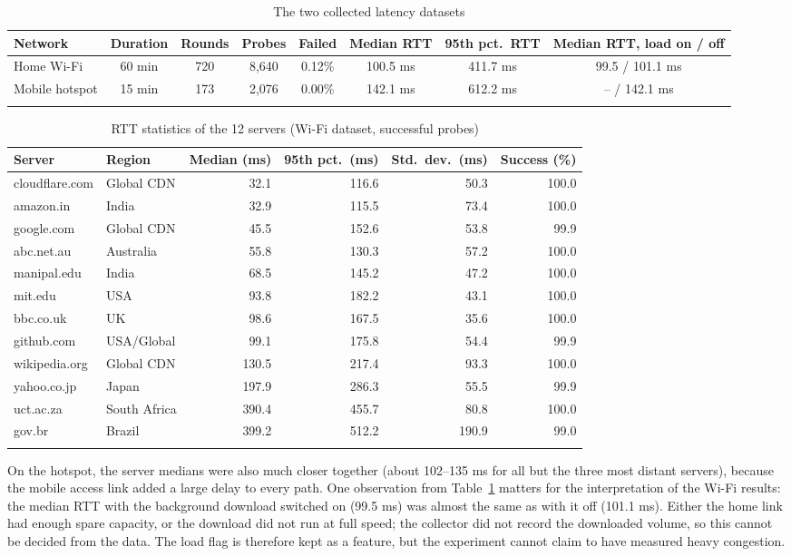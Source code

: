 \documentclass[pdflatex,sn-mathphys-num]{sn-jnl}
\begin{document}
\begin{table}[h]
\caption{The two collected latency datasets}\label{tab:datasets}
\centering
\footnotesize
\setlength{\tabcolsep}{3pt}
\begin{tabular}{@{}lccccccc@{}}
\toprule
Network & Duration & Rounds & Probes & Failed & Median RTT & 95th pct.\ RTT & Median RTT, load on / off \\
\midrule
Home Wi-Fi & 60 min & 720 & 8{,}640 & 0.12\% & 100.5 ms & 411.7 ms & 99.5 / 101.1 ms \\
Mobile hotspot & 15 min & 173 & 2{,}076 & 0.00\% & 142.1 ms & 612.2 ms & -- / 142.1 ms \\
\botrule
\end{tabular}
\end{table}

\begin{table}[h]
\caption{RTT statistics of the 12 servers (Wi-Fi dataset, successful probes)}\label{tab:servers}
\centering
\footnotesize
\begin{tabular}{@{}llrrrr@{}}
\toprule
Server & Region & Median (ms) & 95th pct.\ (ms) & Std.\ dev.\ (ms) & Success (\%) \\
\midrule
cloudflare.com & Global CDN & 32.1 & 116.6 & 50.3 & 100.0 \\
amazon.in & India & 32.9 & 115.5 & 73.4 & 100.0 \\
google.com & Global CDN & 45.5 & 152.6 & 53.8 & 99.9 \\
abc.net.au & Australia & 55.8 & 130.3 & 57.2 & 100.0 \\
manipal.edu & India & 68.5 & 145.2 & 47.2 & 100.0 \\
mit.edu & USA & 93.8 & 182.2 & 43.1 & 100.0 \\
bbc.co.uk & UK & 98.6 & 167.5 & 35.6 & 100.0 \\
github.com & USA/Global & 99.1 & 175.8 & 54.4 & 99.9 \\
wikipedia.org & Global CDN & 130.5 & 217.4 & 93.3 & 100.0 \\
yahoo.co.jp & Japan & 197.9 & 286.3 & 55.5 & 99.9 \\
uct.ac.za & South Africa & 390.4 & 455.7 & 80.8 & 100.0 \\
gov.br & Brazil & 399.2 & 512.2 & 190.9 & 99.0 \\
\botrule
\end{tabular}
\end{table}

On the hotspot, the server medians were also much closer together (about 102--135 ms for all but the three most distant servers), because the mobile access link added a large delay to every path. One observation from Table~\ref{tab:datasets} matters for the interpretation of the Wi-Fi results: the median RTT with the background download switched on (99.5 ms) was almost the same as with it off (101.1 ms). Either the home link had enough spare capacity, or the download did not run at full speed; the collector did not record the downloaded volume, so this cannot be decided from the data. The load flag is therefore kept as a feature, but the experiment cannot claim to have measured heavy congestion.
\end{document}
